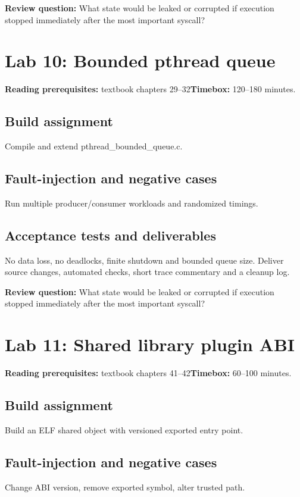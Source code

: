 \documentclass[11pt,letterpaper,oneside]{report}
\begin{document}
\textbf{Review question:} What state would be leaked or corrupted if execution stopped immediately after the most important syscall?

\section{Lab 10: Bounded pthread queue}
\textbf{Reading prerequisites:} textbook chapters 29--32\quad \textbf{Timebox:} 120--180 minutes.

\subsection{Build assignment}
Compile and extend pthread\_bounded\_queue.c.

\subsection{Fault-injection and negative cases}
Run multiple producer/consumer workloads and randomized timings.

\subsection{Acceptance tests and deliverables}
No data loss, no deadlocks, finite shutdown and bounded queue size. Deliver source changes, automated checks, short trace commentary and a cleanup log.

\textbf{Review question:} What state would be leaked or corrupted if execution stopped immediately after the most important syscall?

\section{Lab 11: Shared library plugin ABI}
\textbf{Reading prerequisites:} textbook chapters 41--42\quad \textbf{Timebox:} 60--100 minutes.

\subsection{Build assignment}
Build an ELF shared object with versioned exported entry point.

\subsection{Fault-injection and negative cases}
Change ABI version, remove exported symbol, alter trusted path.
\end{document}

